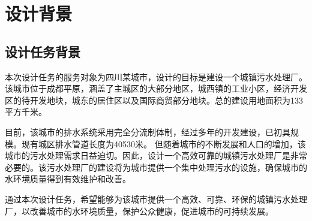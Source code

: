 \section{设计背景}
\subsection{设计任务背景}

本次设计任务的服务对象为四川某城市，设计的目标是建设一个城镇污水处理厂。该城市位于成都平原，涵盖了主城区的大部分地区，城西镇的工业小区，经济开发区的待开发地块，城东的居住区以及国际商贸部分地块。总的建设用地面积为133平方千米。

目前，该城市的排水系统采用完全分流制体制，经过多年的开发建设，已初具规模。现有城区排水管道长度为40530米。
但随着城市的不断发展和人口的增加，该城市的污水处理需求日益迫切。因此，设计一个高效可靠的城镇污水处理厂是非常必要的。该污水处理厂的建设将为城市提供一个集中处理污水的设施，确保城市的水环境质量得到有效维护和改善。


通过本次设计任务，希望能够为该城市提供一个高效、可靠、环保的城镇污水处理厂，以改善城市的水环境质量，保护公众健康，促进城市的可持续发展。



